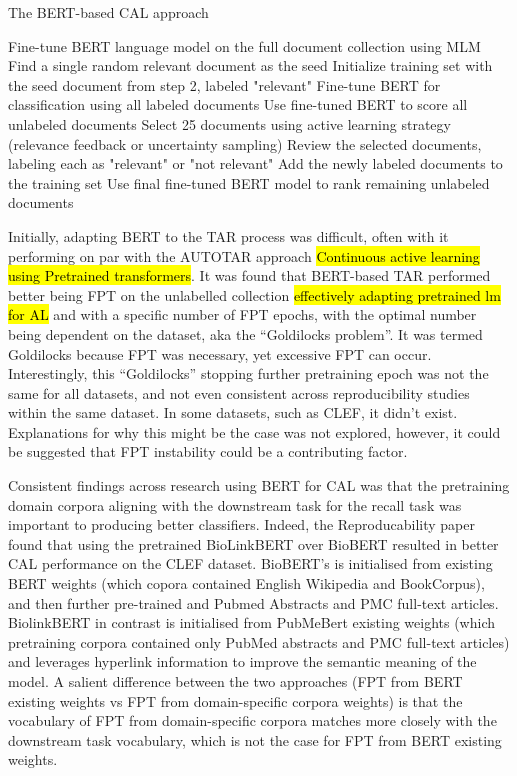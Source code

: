 \documentclass{article}
\begin{document}
\begin{algorithm}
    \caption{The BERT-based CAL approach}
    \label{alg:bert-tar}
    \begin{algorithmic}[1]
    \State Fine-tune BERT language model on the full document collection using MLM
    \State Find a single random relevant document as the seed
    \State Initialize training set with the seed document from step 2, labeled "relevant"
    \Repeat
    \State Fine-tune BERT for classification using all labeled documents
    \State Use fine-tuned BERT to score all unlabeled documents
    \State Select 25 documents using active learning strategy (relevance feedback or uncertainty sampling)
    \State Review the selected documents, labeling each as "relevant" or "not relevant"
    \State Add the newly labeled documents to the training set
    \State Use final fine-tuned BERT model to rank remaining unlabeled documents
    \end{algorithmic}
    \end{algorithm}

Initially, adapting BERT to the TAR process was difficult, often with it performing on par with the AUTOTAR approach \hl{Continuous active learning using Pretrained transformers}. It was found that BERT-based TAR performed better being FPT on the unlabelled collection \hl{effectively adapting pretrained lm for AL} and with a specific number of FPT epochs, with the optimal number being dependent on the dataset, aka the ``Goldilocks problem''. It was termed Goldilocks because FPT was necessary, yet excessive FPT can occur. Interestingly, this ``Goldilocks'' stopping further pretraining epoch was not the same for all datasets, and not even consistent across reproducibility studies within the same dataset. In some datasets, such as CLEF, it didn't exist. Explanations for why this might be the case was not explored, however, it could be suggested that FPT instability could be a contributing factor.

Consistent findings across research using BERT for CAL was that the pretraining domain corpora aligning with the downstream task for the recall task was important to producing better classifiers. Indeed, the Reproducability paper found that using the pretrained BioLinkBERT over BioBERT resulted in better CAL performance on the CLEF dataset. BioBERT's is initialised from existing BERT weights (which copora contained English Wikipedia and BookCorpus), and then further pre-trained and Pubmed Abstracts and PMC full-text articles. BiolinkBERT in contrast is initialised from PubMeBert existing weights (which pretraining corpora contained only PubMed abstracts and PMC full-text articles) and leverages hyperlink information to improve the semantic meaning of the model. A salient difference between the two approaches (FPT from BERT existing weights vs FPT from domain-specific corpora weights) is that the vocabulary of FPT from domain-specific corpora matches more closely with the downstream task vocabulary, which is not the case for FPT from BERT existing weights.
\end{document}
